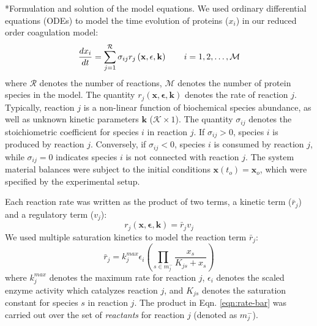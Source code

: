 \documentclass[12pt]{article}
\makeatletter
\renewcommand\subsection{\@startsection
	{subsection}{2}{0mm}
	{-0.05in}
	{-0.5\baselineskip}
	{\normalfont\normalsize\bfseries}}
\makeatother
\begin{document}
\subsection*{Formulation and solution of the model equations.}
We used ordinary differential equations (ODEs) to model the time evolution of proteins ($x_{i}$) in our reduced order coagulation model:
\begin{equation}
	\frac{dx_{i}}{dt}  =  \sum_{j = 1}^{\mathcal{R}}\sigma_{ij}r_{j}\left(\mathbf{x},\mathbf{\epsilon},\mathbf{k}\right)\qquad{i=1,2,\hdots,\mathcal{M}}\\
\end{equation}
where $\mathcal{R}$ denotes the number of reactions, $\mathcal{M}$ denotes the number of protein species in the model. 
The quantity $r_{j}\left(\mathbf{x},\mathbf{\epsilon},\mathbf{k}\right)$ denotes the rate of reaction $j$. 
Typically, reaction $j$ is a non-linear function of biochemical species abundance, as well as unknown kinetic parameters $\mathbf{k}$ ($\mathcal{K}\times{1}$). 
The quantity $\sigma_{ij}$ denotes the stoichiometric coefficient for species $i$ in reaction $j$. 
If $\sigma_{ij}>0$, species $i$ is produced by reaction $j$. 
Conversely, if $\sigma_{ij}<0$, species $i$ is consumed by reaction $j$, while $\sigma_{ij} = 0$ indicates species $i$ is not connected with reaction $j$. 
The system material balances were subject to the initial conditions $\mathbf{x}\left(t_{o}\right) = \mathbf{x}_{o}$, which were specified by the experimental setup.

Each reaction rate was written as the product of two terms, a kinetic term ($\bar{r}_{j}$) and a regulatory term ($v_{j}$):
\begin{equation}\label{eqn:rate-factor}
	r_{j}\left(\mathbf{x},\mathbf{\epsilon},\mathbf{k}\right) = \bar{r}_{j}v_{j}
\end{equation}
We used multiple saturation kinetics to model the reaction term $\bar{r}_{j}$:
\begin{equation}\label{eqn:rate-bar}
	\bar{r}_{j} = k_{j}^{max}\epsilon_{i}\left(\prod_{s\in{m_{j}^{-}}}\frac{x_{s}}{K_{js} + x_{s}}\right)
\end{equation}where $k_{j}^{max}$ denotes the maximum rate for reaction $j$, $\epsilon_{i}$ denotes the scaled enzyme activity which catalyzes reaction $j$, and
$K_{js}$ denotes the saturation constant for species $s$ in reaction $j$. 
The product in Eqn. \eqref{eqn:rate-bar} was carried out over the set of \textit{reactants} for reaction $j$ (denoted as $m_{j}^{-}$). 
\end{document}
